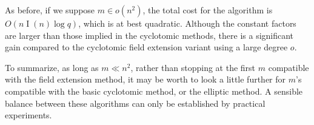\documentclass{article}
\DeclareMathOperator{\Inv}{I}
\begin{document}
As before, if we suppose $m\in o(n^2)$, the total cost for the
algorithm is $O(n\Inv(n)\log q)$, which is at best quadratic. Although
the constant factors are larger than those implied in the cyclotomic
methods, there is a significant gain compared to the cyclotomic field
extension variant using a large degree $o$.

To summarize, as long as $m\ll n^2$, rather than stopping at the first
$m$ compatible with the field extension method, it may be worth to
look a little further for $m$'s compatible with the basic cyclotomic
method, or the elliptic method. A sensible balance between these
algorithms can only be established by practical experiments.
\end{document}
